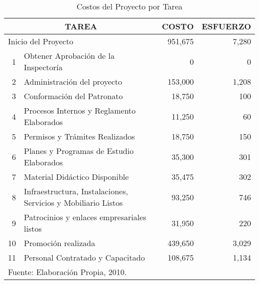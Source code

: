 \begin{table}
    \centering
    \caption{Costos del Proyecto por Tarea}
    \label{tbl:Proy:Costos}
    \footnotesize
    \begin{tabular}{r|l|r|r}
        \multicolumn{2}{c|}{TAREA}                                         & COSTO   & ESFUERZO \\ 
        \hline
        \hline
        \multicolumn{2}{l|}{Inicio del Proyecto}                           & 951,675 & 7,280    \\ 
        \hline
         1 & Obtener Aprobación de la Inspector\'ia                        & 0       & 0        \\ 
         2 & Administraci\'on del proyecto                                 & 153,000 & 1,208    \\ 
         3 & Conformación del Patronato                                    & 18,750  & 100      \\ 
         4 & Procesos Internos y Reglamento Elaborados                     & 11,250  & 60       \\ 
         5 & Permisos y Tr\'amites Realizados                              & 18,750  & 150      \\ 
         6 & Planes y Programas de Estudio Elaborados                      & 35,300  & 301      \\ 
         7 & Material Did\'actico Disponible                               & 35,475  & 302      \\ 
         8 & Infraestructura, Instalaciones, Servicios y Mobiliario Listos & 93,250  & 746      \\ 
         9 & Patrocinios y enlaces empresariales listos                    & 31,950  & 220      \\ 
        10 & Promoci\'on realizada                                         & 439,650 & 3,029    \\ 
        11 & Personal Contratado y Capacitado                              & 108,675 & 1,134    \\ 
        \hline
        \multicolumn{4}{l}{\footnotesize Fuente: Elaboración Propia, 2010.}
    \end{tabular}
\end{table}
